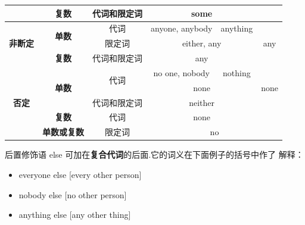 \begin{table}[hbtp]
{\begin{tabular}{|c|c|c|ccc|}
                     & \textbf{复数}                  & 代词和限定词              & \multicolumn{2}{c|}{some}                                             &                       \\ \hline
\multirow{3}{*}{\textbf{非断定}} & \multirow{2}{*}{\textbf{单数}} & 代词                  & \multicolumn{1}{c|}{anyone, anybody}  & \multicolumn{1}{c|}{anything}  & \multirow{3}{*}{any}  \\ \cline{3-5}
                     &                     & 限定词                 & \multicolumn{2}{c|}{either, any}                                        &                       \\ \cline{2-5}
                     & \textbf{复数}                  & 代词和限定词              & \multicolumn{2}{c|}{any}                                              &                       \\ \hline
\multirow{5}{*}{\textbf{否定}} &
  \multirow{3}{*}{\textbf{单数}} &
  \multirow{2}{*}{代词} &
  \multicolumn{1}{c|}{no one, nobody} &
  \multicolumn{1}{c|}{nothing} &
  \multirow{3}{*}{none} \\ \cline{4-5}
                     &                     &                     & \multicolumn{2}{c|}{none}                                             &                       \\ \cline{3-5}
                     &                     & 代词和限定词              & \multicolumn{2}{c|}{neither}                                          &                       \\ \cline{2-6}
                     & \textbf{复数}                  & 代词                  & \multicolumn{2}{c|}{none}                                             &                       \\ \cline{2-6}
                     & \textbf{单数或复数}               & 限定词                 & \multicolumn{3}{c|}{no}                                                                       \\ \hline
\end{tabular}%
}
\end{table}

后置修饰语 else 可加在\textbf{复合代词}的后面.它的词义在下面例子的括号中作了
解释：
\begin{itemize}
\item everyone else [every other person]
\item nobody else [no other person]
\item anything else [any other thing]
\end{itemize}

